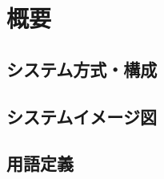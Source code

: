 \section{概要} \label{sec:overview}

\subsection{システム方式・構成}


\subsection{システムイメージ図}


\subsection{用語定義}
